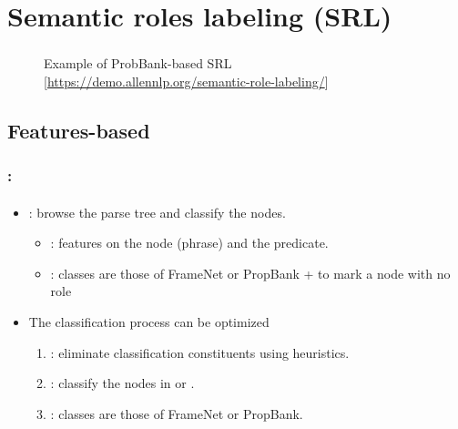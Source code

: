 \documentclass[xcolor=table]{beamer}
\begin{document}
\section{Semantic roles labeling (SRL)}

\begin{frame}
	\frametitle{\insertshortsubtitle}
	\framesubtitle{\insertsection}

	\begin{figure}
		\caption{Example of ProbBank-based SRL [\url{https://demo.allennlp.org/semantic-role-labeling/}]}
	\end{figure}
	
\end{frame}

\subsection{Features-based}

\begin{frame}
	\frametitle{\insertshortsubtitle: \insertsection}
	\framesubtitle{\insertsubsection}
	
	\begin{itemize}
		\item {}: browse the parse tree and classify the nodes.
		\begin{itemize}
			\item {}: features on the node (phrase) and the predicate.
			\item {}: classes are those of FrameNet or PropBank +  to mark a node with no role
		\end{itemize} 
		\item The classification process can be optimized
		\begin{enumerate}
			\item {}: eliminate classification constituents using heuristics.
			\item {}: classify the nodes in  or .
			\item {}: classes are those of FrameNet or PropBank.
		\end{enumerate} 
	\end{itemize}
	
\end{frame}
\end{document}
